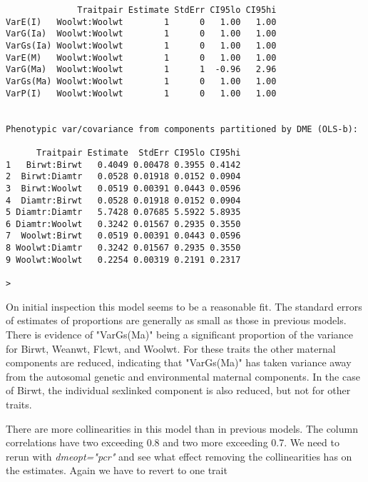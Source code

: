 \documentclass[titlepage]{article}  %
\begin{document}
\begin{verbatim}
              Traitpair Estimate StdErr CI95lo CI95hi
VarE(I)   Woolwt:Woolwt        1      0   1.00   1.00
VarG(Ia)  Woolwt:Woolwt        1      0   1.00   1.00
VarGs(Ia) Woolwt:Woolwt        1      0   1.00   1.00
VarE(M)   Woolwt:Woolwt        1      0   1.00   1.00
VarG(Ma)  Woolwt:Woolwt        1      1  -0.96   2.96
VarGs(Ma) Woolwt:Woolwt        1      0   1.00   1.00
VarP(I)   Woolwt:Woolwt        1      0   1.00   1.00


Phenotypic var/covariance from components partitioned by DME (OLS-b):

      Traitpair Estimate  StdErr CI95lo CI95hi
1   Birwt:Birwt   0.4049 0.00478 0.3955 0.4142
2  Birwt:Diamtr   0.0528 0.01918 0.0152 0.0904
3  Birwt:Woolwt   0.0519 0.00391 0.0443 0.0596
4  Diamtr:Birwt   0.0528 0.01918 0.0152 0.0904
5 Diamtr:Diamtr   5.7428 0.07685 5.5922 5.8935
6 Diamtr:Woolwt   0.3242 0.01567 0.2935 0.3550
7  Woolwt:Birwt   0.0519 0.00391 0.0443 0.0596
8 Woolwt:Diamtr   0.3242 0.01567 0.2935 0.3550
9 Woolwt:Woolwt   0.2254 0.00319 0.2191 0.2317

> 
\end{verbatim}
 
On initial inspection this model seems to be a reasonable fit. The standard errors of estimates of proportions  are generally as small as those in previous models. There is evidence of "VarGs(Ma)" being a significant proportion of the variance for Birwt, Weanwt, Flcwt, and Woolwt. For these traits the other maternal components are reduced, indicating that "VarGs(Ma)" has taken variance away from the autosomal genetic and environmental maternal components. In the case of Birwt, the individual sexlinked component is also reduced, but not for other traits.
 
There are more collinearities in this model than in previous models. The column correlations have two exceeding 0.8 and two more exceeding 0.7. We need to rerun with {\em dmeopt="pcr"} and see what effect removing the collinearities has on the estimates. Again we have to revert to one trait
\end{document}
